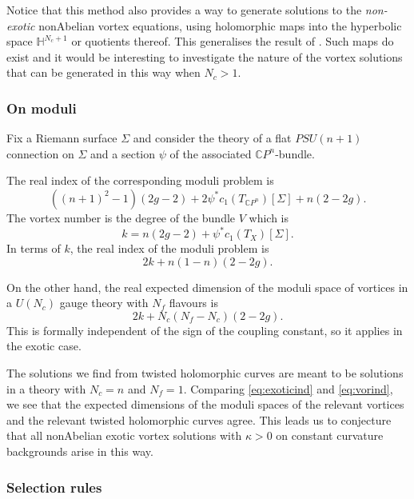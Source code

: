 \documentclass[10pt]{article}
\theoremstyle{definition}
\begin{document}
Notice that this method also provides a way to generate solutions to the \emph{non-exotic} nonAbelian vortex equations, using holomorphic maps into the hyperbolic space \(\mathbb{H}^{N_c +1 }\) or quotients thereof. This generalises the result of \cite{wittenMPS}. Such maps do exist and it would be interesting to investigate the nature of the vortex solutions that can be generated in this way when \(N_c >1\).



\subsubsection{On moduli}

Fix a Riemann surface \(\Sigma\) and consider the theory of a flat \(PSU(n+1)\) connection on \(\Sigma\) and a section \(\psi\) of the associated \(\mathbb{C}P^n\)-bundle. 

The real index of the corresponding moduli problem is
\[
((n+1)^2-1)(2g-2) + 2 \psi^*c_1(T_{\mathbb{C}P^n}) [\Sigma] + n (2-2g) \text{.}
\]
The vortex number is the degree of the bundle \(V\) which is
\begin{equation}
\label{eq:RHNA}
k = n(2g-2) + \psi^*c_1(T_X) [\Sigma]  \text{.}
\end{equation}
In terms of \(k\), the real index of the moduli problem is
\begin{equation}
\label{eq:exoticind}
2k + n(1-n)(2-2g)\text{.}
\end{equation}

On the other hand, the real expected dimension of the moduli space of vortices in a \(U(N_c)\) gauge theory with \(N_f\) flavours is
\begin{equation}
\label{eq:vorind}
2k + N_c(N_f-N_c)(2-2g)\text{.}
\end{equation}
This is formally independent of the sign of the coupling constant, so it applies in the exotic case.

The solutions we find from twisted holomorphic curves are meant to be solutions in a theory with \(N_c = n\) and \(N_f = 1\). Comparing \eqref{eq:exoticind} and \eqref{eq:vorind}, we see that the expected dimensions of the moduli spaces of the relevant vortices and the relevant twisted holomorphic curves agree. This leads us to conjecture that all nonAbelian exotic vortex solutions with \(\kappa > 0\) on constant curvature backgrounds arise in this way. 


\subsubsection{Selection rules}
\end{document}
